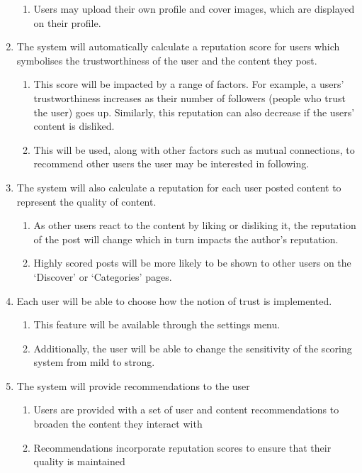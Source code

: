 \begin{enumerate}[label=\textbf{F\arabic*}]
\begin{enumerate}
			\item Users may upload their own profile and cover images, which are displayed on their profile.
		\end{enumerate}
	\item The system will automatically calculate a reputation score for users which symbolises the trustworthiness of the user and the content they post.
		\begin{enumerate}
			\item This score will be impacted by a range of factors. For example, a users' trustworthiness increases as their number of followers (people who trust the user) goes up. Similarly, this reputation can also decrease if the users' content is disliked.
			\item This will be used, along with other factors such as mutual connections, to recommend other users the user may be interested in following.
		\end{enumerate}
	\item The system will also calculate a reputation for each user posted content to represent the quality of content.
		\begin{enumerate}
			\item As other users react to the content by liking or disliking it, the reputation of the post will change which in turn impacts the author's reputation.
			\item Highly scored posts will be more likely to be shown to other users on the `Discover' or `Categories' pages.
		\end{enumerate}
	\item Each user will be able to choose how the notion of trust is implemented.
		\begin{enumerate}
			\item This feature will be available through the settings menu. 
			\item Additionally, the user will be able to change the sensitivity of the scoring system from mild to strong.
		\end{enumerate}
	\item The system will provide recommendations to the user
	\begin{enumerate}
		\item Users are provided with a set of user and content recommendations to broaden the content they interact with
		\item Recommendations incorporate reputation scores to ensure that their quality is maintained	
	\end{enumerate}

\end{enumerate}
